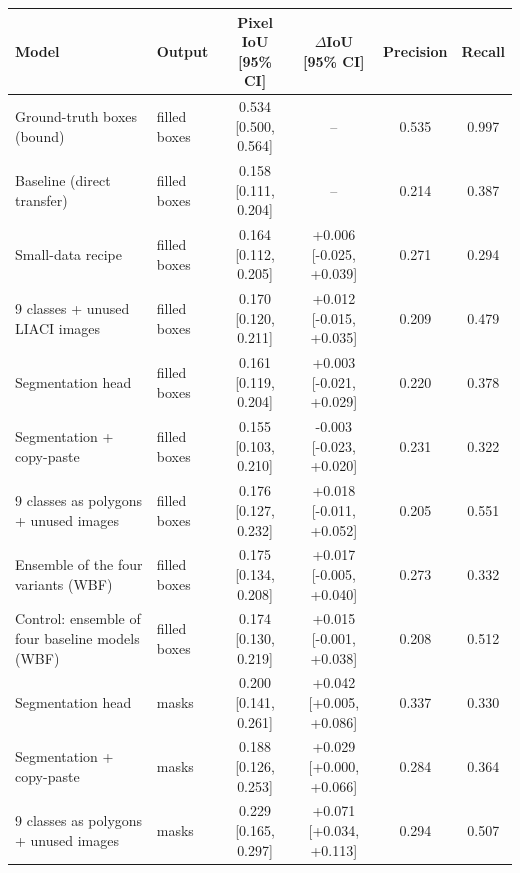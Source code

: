 \begin{tabular}{llcccc}
\toprule
Model & Output & Pixel IoU [95\% CI] & $\Delta$IoU [95\% CI] & Precision & Recall \\
\midrule
Ground-truth boxes (bound) & filled boxes & 0.534 [0.500, 0.564] & -- & 0.535 & 0.997 \\
Baseline (direct transfer) & filled boxes & 0.158 [0.111, 0.204] & -- & 0.214 & 0.387 \\
Small-data recipe & filled boxes & 0.164 [0.112, 0.205] & +0.006 [-0.025, +0.039] & 0.271 & 0.294 \\
9 classes + unused LIACI images & filled boxes & 0.170 [0.120, 0.211] & +0.012 [-0.015, +0.035] & 0.209 & 0.479 \\
Segmentation head & filled boxes & 0.161 [0.119, 0.204] & +0.003 [-0.021, +0.029] & 0.220 & 0.378 \\
Segmentation + copy-paste & filled boxes & 0.155 [0.103, 0.210] & -0.003 [-0.023, +0.020] & 0.231 & 0.322 \\
9 classes as polygons + unused images & filled boxes & 0.176 [0.127, 0.232] & +0.018 [-0.011, +0.052] & 0.205 & 0.551 \\
Ensemble of the four variants (WBF) & filled boxes & 0.175 [0.134, 0.208] & +0.017 [-0.005, +0.040] & 0.273 & 0.332 \\
Control: ensemble of four baseline models (WBF) & filled boxes & 0.174 [0.130, 0.219] & +0.015 [-0.001, +0.038] & 0.208 & 0.512 \\
Segmentation head & masks & 0.200 [0.141, 0.261] & +0.042 [+0.005, +0.086] & 0.337 & 0.330 \\
Segmentation + copy-paste & masks & 0.188 [0.126, 0.253] & +0.029 [+0.000, +0.066] & 0.284 & 0.364 \\
9 classes as polygons + unused images & masks & 0.229 [0.165, 0.297] & +0.071 [+0.034, +0.113] & 0.294 & 0.507 \\
\bottomrule
\end{tabular}
